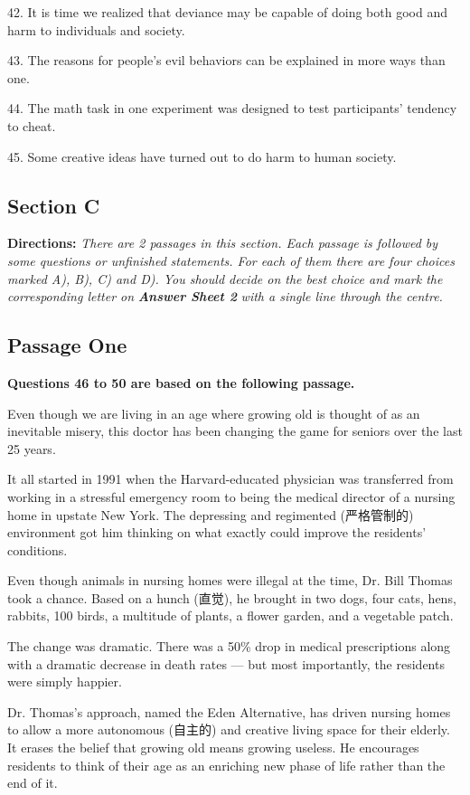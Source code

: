 \documentclass[UTF8,11pt]{ctexart}
\begin{document}
42. It is time we realized that deviance may be capable of doing both good and harm to individuals and society.


43. The reasons for people's evil behaviors can be explained in more ways than one.


44. The math task in one experiment was designed to test participants' tendency to cheat.


45. Some creative ideas have turned out to do harm to human society.


\subsection*{\textbf{Section C}}


\textbf{Directions: }\textit{There are 2 passages in this section. Each passage is followed by some questions or unfinished} \textit{statements. For each of them there are four choices marked A), B), C) and D). You should decide on the best} \textit{choice and mark the corresponding letter on }\textbf{\textit{Answer Sheet 2}}\textit{ with a single line through the centre.}


\subsection*{\textbf{Passage One}}


\textbf{Questions 46 to 50 are based on the following passage.}


Even though we are living in an age where growing old is thought of as an inevitable misery, this doctor has been changing the game for seniors over the last 25 years.


It all started in 1991 when the Harvard-educated physician was transferred from working in a stressful emergency room to being the medical director of a nursing home in upstate New York. The depressing and regimented (严格管制的) environment got him thinking on what exactly could improve the residents' conditions.


Even though animals in nursing homes were illegal at the time, Dr. Bill Thomas took a chance. Based on a hunch (直觉), he brought in two dogs, four cats, hens, rabbits, 100 birds, a multitude of plants, a flower garden, and a vegetable patch.


The change was dramatic. There was a 50\% drop in medical prescriptions along with a dramatic decrease in death rates — but most importantly, the residents were simply happier.


Dr. Thomas's approach, named the Eden Alternative, has driven nursing homes to allow a more autonomous (自主的) and creative living space for their elderly. It erases the belief that growing old means growing useless. He encourages residents to think of their age as an enriching new phase of life rather than the end of it.
\end{document}
